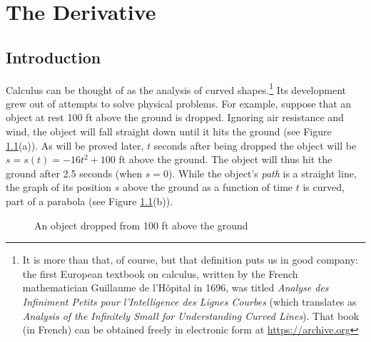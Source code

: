 \chapter{The Derivative}\label{ch:derivative}
\section{Introduction}\label{sec:intro}
Calculus can be thought of as the analysis of curved shapes.\footnote{It is more
than that, of course, but that definition puts us in good company:
the first European textbook on calculus, written by the French mathematician
Guillaume de l'H\^{o}pital in 1696, was titled \emph{Analyse des Infiniment
Petits pour l'Intelligence des Lignes Courbes} (which translates as
\emph{Analysis of the Infinitely Small for Understanding Curved Lines}). That
book (in French) can be obtained freely in electronic form at
\url{https://archive.org}}
Its development grew out of attempts to solve physical problems.
For example, suppose that an object at rest 100 ft above the ground is dropped.
Ignoring air resistance and wind, the object will fall straight down until it
hits the ground (see Figure \ref{fig:fall}(a)). As will be proved later,
$t$ seconds after being dropped the object will be
$s = s(t) = -16t^2 + 100$ ft above the ground. The object will thus hit
the ground after 2.5 seconds (when $s = 0$). While the object's \emph{path} is a
straight line, the graph of its position $s$ above the ground as a function of
time $t$ is curved, part of a parabola (see Figure \ref{fig:fall}(b)).

\begin{figure}[ht]
 \centering
 \qquad\qquad
 \caption[]{\quad An object dropped from 100 ft above the ground}
 \label{fig:fall}
\end{figure}

